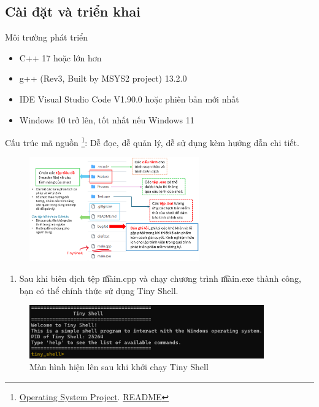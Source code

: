 \subsection{Cài đặt và triển khai}
\begin{frame}{Môi trường phát triển}
 \begin{itemize}
        \item {} C++ 17 hoặc lớn hơn
        \item {} g++ (Rev3, Built by MSYS2 project) 13.2.0
        \item {} IDE Visual Studio Code V1.90.0 hoặc phiên bản mới nhất
        \item {} Windows 10 trở lên, tốt nhất nếu Windows 11
    \end{itemize}
\end{frame}

\begin{frame}{Cấu trúc mã nguồn}
\footnote{ \href{https://github.com/HaiAu2501/Operating-System-Project}{Operating System Project}.  \href{https://github.com/HaiAu2501/Operating-System-Project/blob/main/README.md}{README}}: Dễ đọc, dễ quản lý, dễ sử dụng kèm hướng dẫn chi tiết.
\begin{figure}[h]
        \centering
        \includegraphics[width=0.65\textwidth]{images/03.png}
    \end{figure}
\end{frame}

\begin{frame}
\begin{enumerate}
    \item Sau khi biên dịch tệp \t{main.cpp} và chạy chương trình \t{main.exe} thành công, bạn có thể chính thức sử dụng Tiny Shell.
\end{enumerate}
    \begin{figure}[h]
        \centering
        \includegraphics[width=0.9\textwidth]{images/01.png}
        \caption{Màn hình hiện lên sau khi khởi chạy Tiny Shell}
    \end{figure}
\end{frame}

